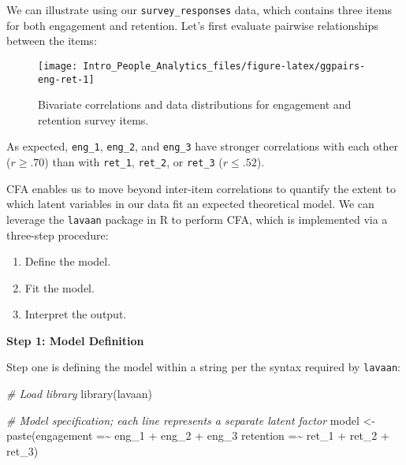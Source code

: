 \documentclass[
]{book}
\newenvironment{Shaded}{\begin{snugshade}}{\end{snugshade}}
\newcommand{\CommentTok}[1]{\textcolor[rgb]{0.56,0.35,0.01}{\textit{#1}}}
\newcommand{\FunctionTok}[1]{\textcolor[rgb]{0.00,0.00,0.00}{#1}}
\newcommand{\NormalTok}[1]{#1}
\newcommand{\OtherTok}[1]{\textcolor[rgb]{0.56,0.35,0.01}{#1}}
\newcommand{\StringTok}[1]{\textcolor[rgb]{0.31,0.60,0.02}{#1}}
\providecommand{\tightlist}{%
  \setlength{\itemsep}{0pt}\setlength{\parskip}{0pt}}
\begin{document}
We can illustrate using our \texttt{survey\_responses} data, which contains three items for both engagement and retention. Let's first evaluate pairwise relationships between the items:

\begin{figure}

{\centering \texttt{[image: Intro\_People\_Analytics\_files/figure-latex/ggpairs-eng-ret-1]} 

}

\caption{Bivariate correlations and data distributions for engagement and retention survey items.}\label{fig:ggpairs-eng-ret}
\end{figure}

As expected, \texttt{eng\_1}, \texttt{eng\_2}, and \texttt{eng\_3} have stronger correlations with each other (\(r \ge .70\)) than with \texttt{ret\_1}, \texttt{ret\_2}, or \texttt{ret\_3} (\(r \le .52\)).

CFA enables us to move beyond inter-item correlations to quantify the extent to which latent variables in our data fit an expected theoretical model. We can leverage the \texttt{lavaan} package in R to perform CFA, which is implemented via a three-step procedure:

\begin{enumerate}
\def\labelenumi{\arabic{enumi}.}
\tightlist
\item
  Define the model.
\item
  Fit the model.
\item
  Interpret the output.
\end{enumerate}

\textbf{Step 1: Model Definition}

Step one is defining the model within a string per the syntax required by \texttt{lavaan}:

\begin{Shaded}
\begin{Highlighting}[]
\CommentTok{\# Load library}
\FunctionTok{library}\NormalTok{(lavaan)}

\CommentTok{\# Model specification; each line represents a separate latent factor}
\NormalTok{model }\OtherTok{\textless{}{-}} \FunctionTok{paste}\NormalTok{(}\StringTok{\textquotesingle{}engagement =\textasciitilde{} eng\_1 + eng\_2 + eng\_3}
\StringTok{                retention =\textasciitilde{} ret\_1 + ret\_2 + ret\_3\textquotesingle{}}\NormalTok{)}
\end{Highlighting}
\end{Shaded}
\end{document}
